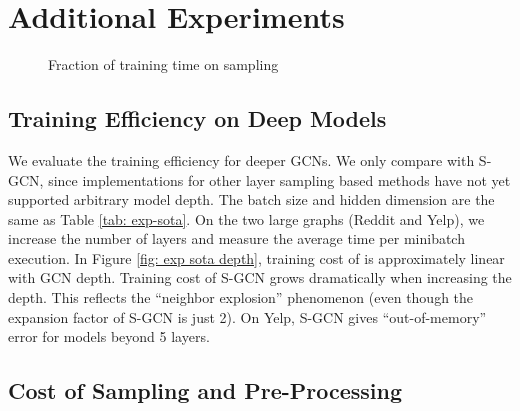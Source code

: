 \section{Additional Experiments}
\label{appendix: add-exp}



\begin{figure}
\centering
\begin{minipage}[b]{.48\textwidth}
  \centering
  
  \caption{Comparison of training efficiency}
  \label{fig: exp sota depth}
\end{minipage}
\hfill
\begin{minipage}[b]{.48\textwidth}
  \centering
  
  \caption{Fraction of training time on sampling\label{fig: preproc cost}}
\end{minipage}
\end{figure}

\subsection{Training Efficiency on Deep Models}
\label{appendix: depth}
We evaluate the training efficiency for deeper GCNs. 
We only compare with S-GCN, since implementations for other layer sampling based methods have not yet supported arbitrary model depth. 
The batch size and hidden dimension are the same as Table \ref{tab: exp-sota}. 
On the two large graphs (Reddit and Yelp), we increase the number of layers and measure the average time per minibatch execution. In Figure \ref{fig: exp sota depth}, training cost of {\graphsaint} is approximately linear with GCN depth. Training cost of S-GCN grows dramatically when increasing the depth. This reflects the ``neighbor explosion'' phenomenon (even though the expansion factor of S-GCN is just 2). On Yelp, S-GCN gives ``out-of-memory'' error for models beyond 5 layers.


\subsection{Cost of Sampling and Pre-Processing}
\label{appendix: sampler cost}

